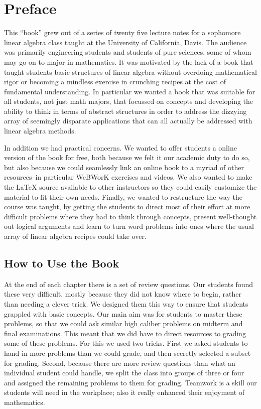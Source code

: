 
\section*{Preface}

This ``book'' grew out of a series of twenty five lecture notes for a sophomore linear algebra class
taught at the University of California, Davis. The audience was primarily engineering students and
students of pure sciences, some of whom may go on to major in mathematics.
It was motivated by the lack of a book that 
 taught students basic structures of linear algebra without overdoing mathematical rigor
 or becoming a mindless exercise in crunching recipes at the cost of fundamental understanding.
In particular we wanted a book that was suitable for all students, not just math majors, that focussed
on concepts and developing the ability to think in terms of abstract structures in order to address the 
dizzying array of seemingly disparate applications that can all actually be addressed with linear algebra methods.

In addition we had practical concerns. We wanted to offer students a online version of the book for free, both because
we felt it our academic duty to do so, but also because we could seamlessly link an online book to a myriad of other 
resources--in particular WeBWorK exercises and videos. We also wanted to make the LaTeX source available to other instructors
so they could easily customize the material to fit their own needs. Finally, we wanted to restructure the way the course 
was taught, by getting the students to direct most of their effort at more difficult problems where they had to think through
concepts,  present well-thought out logical arguments and learn to turn word problems into ones where the usual array of linear algebra recipes could take over.

\subsection*{How to Use the Book}

At the end of each chapter there is a set of review questions. Our students found these very difficult, mostly because they 
did not know where to begin, rather than needing a clever trick. We designed them this way to ensure that students grappled with 
basic concepts. Our main aim was for students to master these problems, so that we could ask similar high caliber problems on midterm and
final examinations. This meant that we did have to direct resources to grading some of these problems. For this we used two tricks.
First we asked students to hand in more problems than we could grade, and then secretly selected a subset for grading.
Second, because there are more review questions than what an individual student could handle, we split the class into groups of three
or four and assigned the remaining problems to them for grading. Teamwork is a skill our students will need in the workplace;
also it really enhanced their enjoyment of mathematics.

